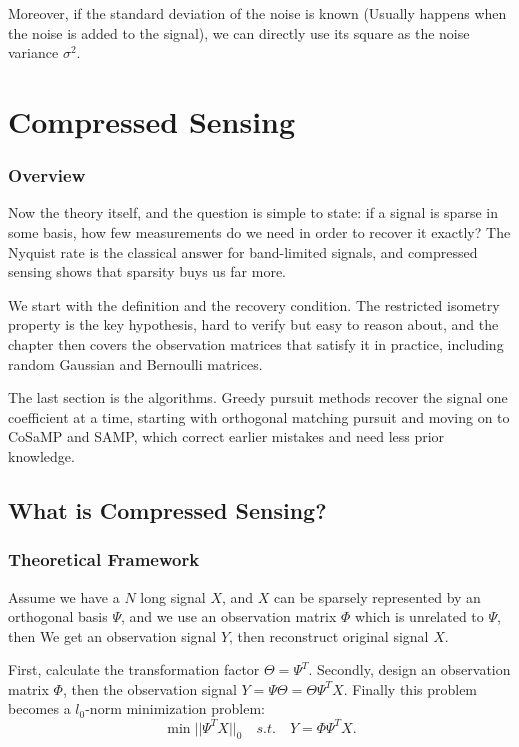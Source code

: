 \documentclass[10pt,a4paper,oneside,numbers=noenddot]{scrbook}
\theoremstyle{ctplain}
\theoremstyle{ctresult}
\begin{document}
Moreover, if the standard deviation of the noise is known (Usually happens when the
noise is added to the signal), we can directly use its square as the noise variance
$\sigma^2$.

\chapter{Compressed Sensing}

\subsection*{Overview}

Now the theory itself, and the question is simple to state: if a signal is sparse in some
basis, how few measurements do we need in order to recover it exactly? The Nyquist rate is
the classical answer for band-limited signals, and compressed sensing shows that sparsity
buys us far more.

We start with the definition and the recovery condition. The restricted isometry property
is the key hypothesis, hard to verify but easy to reason about, and the chapter then covers
the observation matrices that satisfy it in practice, including random Gaussian and
Bernoulli matrices.

The last section is the algorithms. Greedy pursuit methods recover the signal one
coefficient at a time, starting with orthogonal matching pursuit and moving on to CoSaMP
and SAMP, which correct earlier mistakes and need less prior knowledge.


\section{What is Compressed Sensing?}

\subsection{Theoretical Framework}

Assume we have a $N$ long signal $X$, and $X$ can be sparsely represented by an orthogonal
basis $\Psi$, and we use an observation matrix $\Phi$ which is unrelated to $\Psi$, then We
get an observation signal $Y$, then reconstruct original signal $X$.

First, calculate the transformation factor $\Theta = \Psi^T$. Secondly, design an observation
matrix $\Phi$, then the observation signal $Y = \Psi \Theta = \Theta \Psi^T X$. Finally
this problem becomes a $l_0$-norm minimization problem:
\[
\min ||\Psi^T X||_0 \quad s.t. \quad Y = \Phi \Psi^T X.
\]
\end{document}
